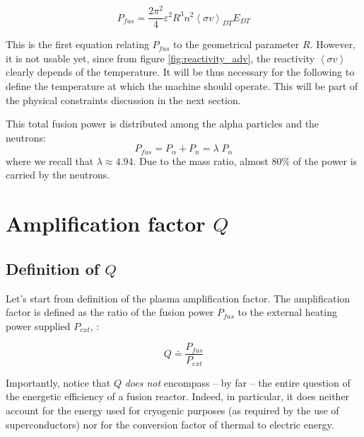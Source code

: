 \begin{equation}
	P_{fus} = \frac{2\pi^2}{4}
  				\varepsilon^2 R^3
				n^2 \left< \sigma v \right>_{DT} E_{DT}
	\label{eq:FusionPower1}
\end{equation}

This is the first equation relating $P_{fus}$ to the geometrical parameter $R$. However, it is not usable yet, since from figure \ref{fig:reactivity_adv}, the reactivity $\left< \sigma v \right>$ clearly depends of the temperature. It will be thus necessary for the following to define the temperature at which the machine should operate. This will be part of the physical constraints discussion in the next section. 


This total fusion power is distributed among the alpha particles and the neutrons: 
\begin{equation}
	P_{fus} 
	= 
	P_\alpha + P_n 
	= 
	\lambda \; P_\alpha
\label{eq:P_fus_Palpha}
\end{equation}
where we recall that $\lambda \approx 4.94$. Due to the mass ratio, almost 80\% of the power is carried by the neutrons. 


\section{Amplification factor $Q$}


\subsection{Definition of $Q$}
Let's start from definition of the plasma amplification factor. The amplification factor is defined as the ratio of the fusion power $P_{fus}$ to the external heating power supplied $P_{ext}$\cite[p.12]{Wesson2004}, \cite[(3.4)]{FusionCEA1987}:

\begin{equation}
	Q \doteq \frac{P_{fus}}{P_{ext}}
\label{eq:definition_Q}
\end{equation}

Importantly, notice that $Q$ \emph{does not} encompass -- by far -- the entire question of the energetic efficiency of a fusion reactor. Indeed, in particular, it does neither account for the energy used for cryogenic purposes (as required by the use of superconductors) nor for the conversion factor of thermal to electric energy.

